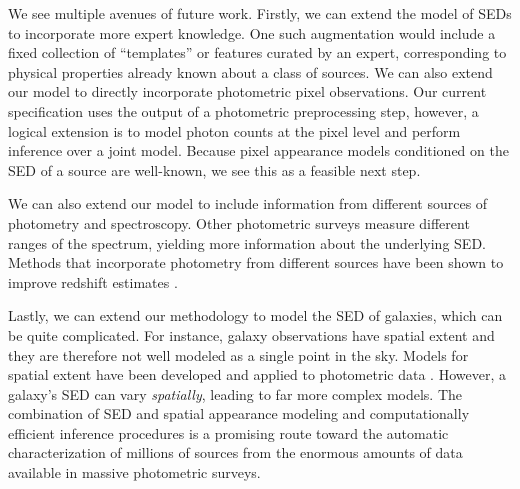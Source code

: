 \documentclass{article}
\begin{document}
We see multiple avenues of future work.
Firstly, we can extend the model of SEDs to incorporate more expert knowledge.
One such augmentation would include a fixed collection of ``templates'' or features curated by an expert, corresponding to physical properties already known about a class of sources.  
We can also extend our model to directly incorporate photometric pixel observations.
Our current specification uses the output of a photometric preprocessing step, however, a logical extension is to model photon counts at the pixel level and perform inference over a joint model. 
Because pixel appearance models conditioned on the SED of a source are well-known, we see this as a feasible next step. 

We can also extend our model to include information from different sources of photometry and spectroscopy.
Other photometric surveys measure different ranges of the spectrum, yielding more information about the underlying SED.
Methods that incorporate photometry from different sources have been shown to improve redshift estimates \cite{brescia2013photometric}.  

Lastly, we can extend our methodology to model the SED of galaxies, which can be quite complicated.
For instance, galaxy observations have spatial extent and they are therefore not well modeled as a single point in the sky.  
Models for spatial extent have been developed and applied to photometric data \cite{hogg2013replacing, regier2015}.  
However, a galaxy's SED can vary \emph{spatially}, leading to far more complex models.    
The combination of SED and spatial appearance modeling and computationally efficient inference procedures is a promising route toward the automatic characterization of millions of sources from the enormous amounts of data available in massive photometric surveys.  

 





\end{document}
